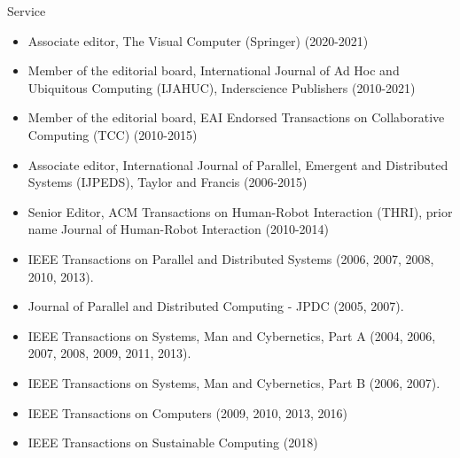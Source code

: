 \begin{category}{Service}

%
%

\begin{itemize}

\item Associate editor, The Visual Computer (Springer) (2020-2021)

\item Member of the editorial board, International Journal of Ad Hoc and Ubiquitous Computing (IJAHUC), Inderscience Publishers (2010-2021)

\item Member of the editorial board, EAI Endorsed Transactions on Collaborative Computing (TCC) (2010-2015)

\item Associate editor, International Journal of Parallel, Emergent and
Distributed Systems (IJPEDS), Taylor and Francis (2006-2015)

\item Senior Editor, ACM Transactions on Human-Robot Interaction (THRI), prior name Journal of Human-Robot Interaction (2010-2014)

\end{itemize}


\begin{itemize}

\item IEEE Transactions on Parallel and Distributed Systems (2006, 2007, 2008, 2010, 2013).

\item Journal of Parallel and Distributed Computing - JPDC (2005, 2007).

\item IEEE Transactions on Systems, Man and Cybernetics, Part A (2004, 2006, 2007, 2008, 2009, 2011, 2013).

\item IEEE Transactions on Systems, Man and Cybernetics, Part B (2006, 2007).

\item IEEE Transactions on Computers (2009, 2010, 2013, 2016)

\item IEEE Transactions on Sustainable Computing (2018)


\end{itemize}
\end{category}
